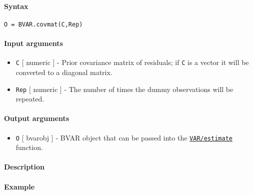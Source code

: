


	\paragraph{Syntax}

\begin{verbatim}
O = BVAR.covmat(C,Rep)
\end{verbatim}

\paragraph{Input arguments}

\begin{itemize}
\item
  \texttt{C} {[} numeric {]} - Prior covariance matrix of residuals; if
  \texttt{C} is a vector it will be converted to a diagonal matrix.
\item
  \texttt{Rep} {[} numeric {]} - The number of times the dummy
  observations will be repeated.
\end{itemize}

\paragraph{Output arguments}

\begin{itemize}
\itemsep1pt\parskip0pt
\item
  \texttt{O} {[} bvarobj {]} - BVAR object that can be passed into the
  \href{VAR/estimate}{\texttt{VAR/estimate}} function.
\end{itemize}

\paragraph{Description}

\paragraph{Example}


